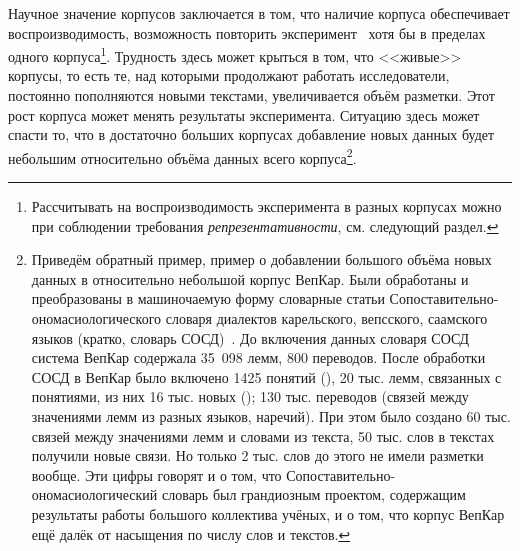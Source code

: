 Научное значение корпусов заключается в том, что наличие корпуса обеспечивает воспроизводимость, 
возможность повторить эксперимент~\cite[409]{Kibrik2019} 
хотя бы в пределах одного корпуса\footnote{%
    Рассчитывать на воспроизводимость эксперимента в разных корпусах можно 
    при соблюдении требования \emph{репрезентативности}, см. следующий раздел.
}. 
Трудность здесь может крыться в том, что <<живые>> корпусы, 
то есть те, над которыми продолжают работать исследователи, 
постоянно пополняются новыми текстами, увеличивается объём разметки. 
Этот рост корпуса может менять результаты эксперимента. 
Ситуацию здесь может спасти то, 
что в достаточно больших корпусах добавление новых данных будет небольшим 
относительно объёма данных всего корпуса\footnote{%
    Приведём обратный пример, пример о добавлении большого объёма новых данных 
    в относительно небольшой корпус ВепКар. 
    Были обработаны и преобразованы в машиночаемую форму словарные статьи 
    Сопоставительно-ономасиологического словаря диалектов карельского, вепсского, саамского языков (кратко, словарь СОСД)~\cite{SOSD2007}. 
    До включения данных словаря СОСД система ВепКар содержала 35~098 лемм, 800 переводов.
    После обработки СОСД в ВепКар было включено 1425 понятий 
        (), 
    20 тыс. лемм, связанных с понятиями, из них 16 тыс. новых (); 
    130 тыс. переводов (связей между значениями лемм из разных языков, наречий). 
    При этом было создано 60 тыс. связей между значениями лемм и словами из текста, 
    50 тыс. слов в текстах получили новые связи. Но только 2 тыс. слов до этого не имели разметки вообще.
    Эти цифры говорят и о том, что Сопоставительно-ономасиологический словарь был грандиозным проектом, 
    содержащим результаты работы большого коллектива учёных, и о том,
    что корпус ВепКар ещё далёк от насыщения по числу слов и текстов.
}.


